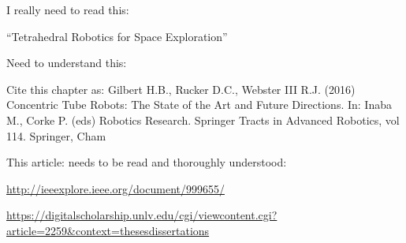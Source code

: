 \documentclass[11pt]{article}
\begin{document}
I really need to read this:

``Tetrahedral Robotics for Space Exploration''

Need to understand this:

Cite this chapter as:
Gilbert H.B., Rucker D.C., Webster III R.J. (2016) Concentric Tube Robots: The State of the Art and Future Directions. In: Inaba M., Corke P. (eds) Robotics Research. Springer Tracts in Advanced Robotics, vol 114. Springer, Cham

This article: needs to be read and thoroughly understood:

\url{http://ieeexplore.ieee.org/document/999655/}

\url{https://digitalscholarship.unlv.edu/cgi/viewcontent.cgi?article=2259&context=thesesdissertations}



\end{document}

